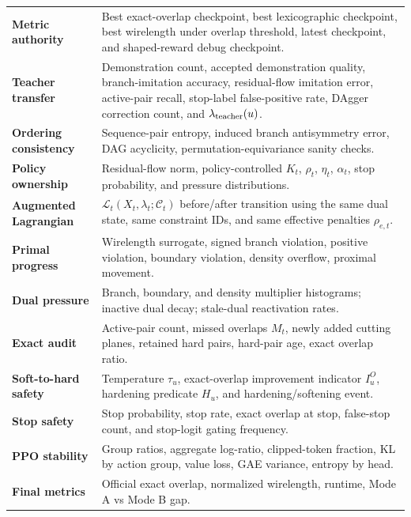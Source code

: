 \documentclass[11pt]{article}
\newcommand{\Constraint}{\mathcal{C}}
\newcommand{\Lagr}{\mathcal{L}}
\begin{document}
\begin{center}
\small
\begin{tabularx}{\textwidth}{>{\bfseries\color{navy}}p{}Y}
Metric authority & Best exact-overlap checkpoint, best lexicographic checkpoint, best wirelength under overlap threshold, latest checkpoint, and shaped-reward debug checkpoint. \\
Teacher transfer & Demonstration count, accepted demonstration quality, branch-imitation accuracy, residual-flow imitation error, active-pair recall, stop-label false-positive rate, DAgger correction count, and $\lambda_{\rm teacher}(u)$. \\
Ordering consistency & Sequence-pair entropy, induced branch antisymmetry error, DAG acyclicity, permutation-equivariance sanity checks. \\
Policy ownership & Residual-flow norm, policy-controlled $K_t$, $\rho_t$, $\eta_t$, $\alpha_t$, stop probability, and pressure distributions. \\
Augmented Lagrangian & $\Lagr_t(X_t,\lambda_t;\Constraint_t)$ before/after transition using the same dual state, same constraint IDs, and same effective penalties $\rho_{e,t}$. \\
Primal progress & Wirelength surrogate, signed branch violation, positive violation, boundary violation, density overflow, proximal movement. \\
Dual pressure & Branch, boundary, and density multiplier histograms; inactive dual decay; stale-dual reactivation rates. \\
Exact audit & Active-pair count, missed overlaps $M_t$, newly added cutting planes, retained hard pairs, hard-pair age, exact overlap ratio. \\
Soft-to-hard safety & Temperature $\tau_u$, exact-overlap improvement indicator $I_u^O$, hardening predicate $H_u$, and hardening/softening event. \\
Stop safety & Stop probability, stop rate, exact overlap at stop, false-stop count, and stop-logit gating frequency. \\
PPO stability & Group ratios, aggregate log-ratio, clipped-token fraction, KL by action group, value loss, GAE variance, entropy by head. \\
Final metrics & Official exact overlap, normalized wirelength, runtime, Mode A vs Mode B gap. \\
\end{tabularx}
\end{center}
\end{document}
